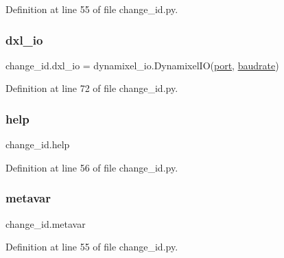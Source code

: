 Definition at line 55 of file change\+\_\+id.\+py.

\mbox{\label{namespacechange__id_aeeb5ee4069adbfd66d78abf35a9d734f}} 
\subsubsection{\texorpdfstring{dxl\+\_\+io}{dxl\_io}}
{\footnotesize\ttfamily change\+\_\+id.\+dxl\+\_\+io = dynamixel\+\_\+io.\+Dynamixel\+IO(\hyperlink{namespacechange__id_ae15063b69d5d5964211d74be8f9a57d9}{port}, \hyperlink{namespacechange__id_a0a8aa88d41ea33a9c067b17f95eb9e50}{baudrate})}



Definition at line 72 of file change\+\_\+id.\+py.

\mbox{\label{namespacechange__id_ac520c3fa5d16dd7e7c34a4f0b4968840}} 
\subsubsection{\texorpdfstring{help}{help}}
{\footnotesize\ttfamily change\+\_\+id.\+help}



Definition at line 56 of file change\+\_\+id.\+py.

\mbox{\label{namespacechange__id_a2408c2470356c31eb8170ff8cac5b2d1}} 
\subsubsection{\texorpdfstring{metavar}{metavar}}
{\footnotesize\ttfamily change\+\_\+id.\+metavar}



Definition at line 55 of file change\+\_\+id.\+py.

\mbox{\label{namespacechange__id_a43b9a142dee6d266957c46b55f7ca4ec}} 
